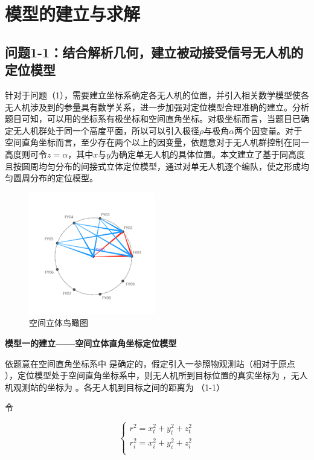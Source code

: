 \section{模型的建立与求解}

\subsection{问题1-1：结合解析几何，建立被动接受信号无人机的定位模型}

针对于问题（1），需要建立坐标系确定各无人机的位置，并引入相关数学模型使各无人机涉及到的参量具有数学关系，进一步加强对定位模型合理准确的建立。分析题目可知，可以用的坐标系有极坐标和空间直角坐标。对极坐标而言，当题目已确定无人机群处于同一个高度平面，所以可以引入极径$\rho$与极角$\alpha$两个因变量。对于空间直角坐标而言，至少存在两个以上的因变量，依题意对于无人机群控制在同一高度则可令$z=\alpha$，其中$x$与$y$为确定单无人机的具体位置。本文建立了基于同高度且按圆周均匀分布的间接式立体定位模型，通过对单无人机逐个编队，使之形成均匀圆周分布的定位模型。

\begin{figure}[h]
    \centering
    \includegraphics{res/AerialView.png}
    \caption{空间立体鸟瞰图}
\end{figure}

\textbf{模型一的建立——空间立体直角坐标定位模型}

依题意在空间直角坐标系中 是确定的，假定引入一参照物观测站（相对于原点 ），定位模型处于空间直角坐标系中，则无人机所到目标位置的真实坐标为 ，无人机观测站的坐标为 。各无人机到目标之间的距离为
 （1-1）

令

\begin{equation}
\begin{cases}
    r^2 = x_t^2 + y_t^2 + z_t^2   \\
    r^2_i = x_i^2 + y_i^2 + z_i^2 \\
\end{cases}
\label{e5-081538}
\end{equation}

